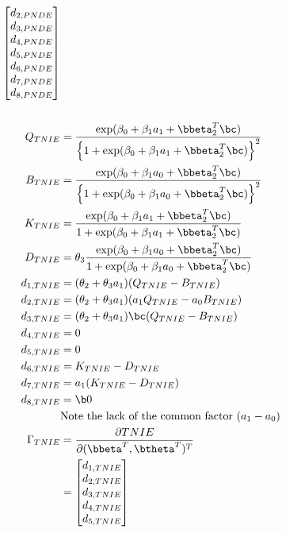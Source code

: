 \documentclass[dvipdfmx,10pt]{article}
\begin{document}
\begin{align*}
\begin{bmatrix}
      d_{2,PNDE}\\
      d_{3,PNDE}\\
      d_{4,PNDE}\\
      d_{5,PNDE}\\
      d_{6,PNDE}\\
      d_{7,PNDE}\\
      d_{8,PNDE}\\
    \end{bmatrix}\\
  \\
  Q_{TNIE} &= \frac
      {\exp(\beta_{0} + \beta_{1}a_{1} + \bbeta_{2}^{T}\bc)}
      {\left\{ 1 + \exp(\beta_{0} + \beta_{1}a_{1} + \bbeta_{2}^{T}\bc) \right\}^{2}}\\
  B_{TNIE} &= \frac
      {\exp(\beta_{0} + \beta_{1}a_{0} + \bbeta_{2}^{T}\bc)}
      {\left\{ 1 + \exp(\beta_{0} + \beta_{1}a_{0} + \bbeta_{2}^{T}\bc) \right\}^{2}}\\
  K_{TNIE} &= \frac
      {\exp(\beta_{0} + \beta_{1}a_{1} + \bbeta_{2}^{T}\bc)}
      {1 + \exp(\beta_{0} + \beta_{1}a_{1} + \bbeta_{2}^{T}\bc)}\\
  D_{TNIE} &= \theta_{3} \frac
      {\exp(\beta_{0} + \beta_{1}a_{0} + \bbeta_{2}^{T}\bc)}
      {1 + \exp(\beta_{0} + \beta_{1}a_{0} + \bbeta_{2}^{T}\bc)}\\
  d_{1,TNIE} &= (\theta_{2} + \theta_{3}a_{1}) (Q_{TNIE} - B_{TNIE})\\
  d_{2,TNIE} &= (\theta_{2} + \theta_{3}a_{1}) (a_{1}Q_{TNIE} - a_{0}B_{TNIE})\\
  d_{3,TNIE} &= (\theta_{2} + \theta_{3}a_{1})\bc (Q_{TNIE} - B_{TNIE})\\
  d_{4,TNIE} &= 0\\
  d_{5,TNIE} &= 0\\
  d_{6,TNIE} &= K_{TNIE} - D_{TNIE}\\
  d_{7,TNIE} &= a_{1} (K_{TNIE} - D_{TNIE})\\
  d_{8,TNIE} &= \b0\\
  &\text{Note the lack of the common factor }(a_{1} - a_{0})\\
  \Gamma_{TNIE}
  &= \frac{\partial TNIE}{\partial (\bbeta^{T},\btheta^{T})^{T}}\\
  &= \begin{bmatrix}
      d_{1,TNIE}\\
      d_{2,TNIE}\\
      d_{3,TNIE}\\
      d_{4,TNIE}\\
      d_{5,TNIE}\\

\end{bmatrix}
\end{align*}
\end{document}
